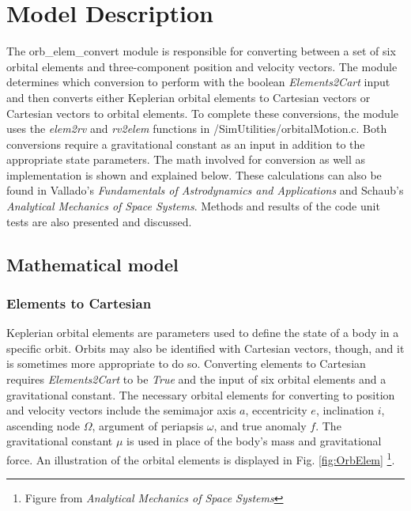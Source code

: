 \section{Model Description}

The orb\_elem\_convert module is responsible for converting between a set of six orbital elements and three-component position and velocity vectors. The module determines which conversion to perform with the boolean \textit{Elements2Cart} input and then converts either Keplerian orbital elements to Cartesian vectors or Cartesian vectors to orbital elements. To complete these conversions, the module uses the \textit{elem2rv} and \textit{rv2elem} functions in /SimUtilities/orbitalMotion.c. Both conversions require a gravitational constant as an input in addition to the appropriate state parameters. The math involved for conversion as well as implementation is shown and explained below. These calculations can also be found in Vallado's \textit{Fundamentals of Astrodynamics and Applications}\cite{bib:1} and Schaub's \textit{Analytical Mechanics of Space Systems}\cite{bib:2}. Methods and results of the code unit tests are also presented and discussed.

\subsection{Mathematical model}

\subsubsection{Elements to Cartesian}

 Keplerian orbital elements are parameters used to define the state of a body in a specific orbit. Orbits may also be identified with Cartesian vectors, though, and it is sometimes more appropriate to do so. Converting elements to Cartesian requires \textit{Elements2Cart} to be \textit{True} and the input of six orbital elements and a gravitational constant. The necessary orbital elements for converting to position and velocity vectors include the semimajor axis $a$, eccentricity $e$, inclination $i$, ascending node $\Omega$, argument of periapsis $\omega$, and true anomaly $f$. The gravitational constant $\mu$ is used in place of the body's mass and gravitational force. An illustration of the orbital elements is displayed in Fig. \ref{fig:OrbElem} \footnote{Figure from \textit{Analytical Mechanics of Space Systems}}.

